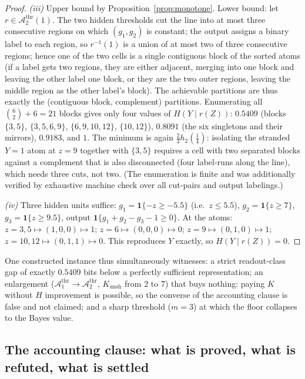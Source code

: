 \documentclass[twocolumn,10pt]{article}
\theoremstyle{definition}
\theoremstyle{remark}
\newcommand{\cA}{\mathcal{A}}
\newcommand{\Athr}[1]{\cA^{\mathrm{thr}}_{#1}}
\newcommand{\hb}{h_2}
\newcommand{\Kunsh}{K_{\mathrm{unsh}}}
\begin{document}
\begin{proof}
\emph{(iii)} Upper bound by Proposition~\ref{prop:monotone}. Lower bound:
let $r \in \Athr{2}(1)$. The two hidden thresholds cut the line into at
most three consecutive regions on which $(g_1, g_2)$ is constant; the
output assigns a binary label to each region, so $r^{-1}(1)$ is a union of
at most two of three consecutive regions; hence one of the two cells is
a single contiguous block of the sorted atoms (if a label gets two regions,
they are either adjacent, merging into one block and leaving the other
label one block, or they are the two outer regions, leaving the middle
region as the other label's block). The achievable partitions are thus
exactly the (contiguous block, complement) partitions. Enumerating all
$\binom{6}{2} + 6 = 21$ blocks gives only four values of
$H(Y \mid r(Z))$: $0.5409$ (blocks $\{3,5\}$, $\{3,5,6,9\}$,
$\{6,9,10,12\}$, $\{10,12\}$), $0.8091$ (the six singletons and their
mirrors), $0.9183$, and $1$. The minimum is again $\tfrac23 \hb(\tfrac14)$:
isolating the stranded $Y{=}1$ atom at $z = 9$ together with $\{3, 5\}$
requires a cell with two separated blocks against a complement that is also
disconnected (four label-runs along the line), which needs three cuts,
not two. (The enumeration is finite and was additionally verified by
exhaustive machine check over all cut-pairs and output labelings.)

\emph{(iv)} Three hidden units suffice:
$g_1 = \mathbf 1\{-z \ge -5.5\}$ (i.e.\ $z \le 5.5$),
$g_2 = \mathbf 1\{z \ge 7\}$, $g_3 = \mathbf 1\{z \ge 9.5\}$, output
$\mathbf 1\{g_1 + g_2 - g_3 - 1 \ge 0\}$. At the atoms:
$z = 3, 5 \mapsto (1,0,0) \mapsto 1$; $z = 6 \mapsto (0,0,0) \mapsto 0$;
$z = 9 \mapsto (0,1,0) \mapsto 1$;
$z = 10, 12 \mapsto (0,1,1) \mapsto 0$. This reproduces $Y$ exactly, so
$H(Y \mid r(Z)) = 0$.
\end{proof}

One constructed instance thus simultaneously witnesses: a strict
readout-class gap of exactly $0.5409$ bits below a perfectly sufficient
representation; an enlargement ($\Athr{1} \to \Athr{2}$, $\Kunsh$ from 2 to 7)
that buys nothing: paying $K$ without $H$ improvement is possible, so
the converse of the accounting clause is false and not claimed; and a sharp
threshold ($m = 3$) at which the floor collapses to the Bayes value.

\subsection{The accounting clause: what is proved, what is refuted,
what is settled}
\label{sec:accounting}
\end{document}
